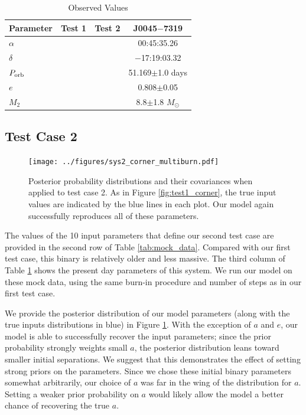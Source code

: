 \documentclass[12pt, preprint]{aastex}
\newcommand{\Msun}{\ifmmode {M_{\odot}}\else${M_{\odot}}$\fi}
\begin{document}
\begin{table}
\label{tab:observations}
\begin{center}
\caption{Observed Values}
\begin{tabular}{lccc} 
\toprule
Parameter & Test 1 & Test 2 & J0045$-$7319 \\
\midrule
$\alpha$ &  &  & 00:45:35.26 \\
$\delta$ &  &  & $-$17:19:03.32 \\
$P_{\rm orb}$ &  &  & 51.169$\pm$1.0 days \\
$e$ &  &  & 0.808$\pm$0.05 \\
$M_2$ &  &  & 8.8$\pm$1.8 \Msun \\
\bottomrule
\end{tabular}
\end{center}
\end{table}


\subsection{Test Case 2}

\begin{figure}[h!]
\begin{center}
\texttt{[image: ../figures/sys2\_corner\_multiburn.pdf]}
\caption{Posterior probability distributions and their covariances when applied to test case 2. As in Figure \ref{fig:test1_corner}, the true input values are indicated by the blue lines in each plot. Our model again successfully reproduces all of these parameters. }
\label{fig:test2_corner}
\end{center}
\end{figure}

The values of the 10 input parameters that define our second test case are provided in the second row of Table \ref{tab:mock_data}. Compared with our first test case, this binary is relatively older and less massive. The third column of Table \ref{tab:observations} shows the present day parameters of this system. We run our model on these mock data, using the same burn-in procedure and number of steps as in our first test case.

We provide the posterior distribution of our model parameters (along with the true inputs distributions in blue) in Figure \ref{fig:test2_corner}. With the exception of $a$ and $e$, our model is able to successfully recover the input parameters; since the prior probability strongly weights small $a$, the posterior distribution leans toward smaller initial separations. We suggest that this demonstrates the effect of setting strong priors on the parameters. Since we chose these initial binary parameters somewhat arbitrarily, our choice of $a$ was far in the wing of the distribution for $a$. Setting a weaker prior probability on $a$ would likely allow the model a better chance of recovering the true $a$.
\end{document}
